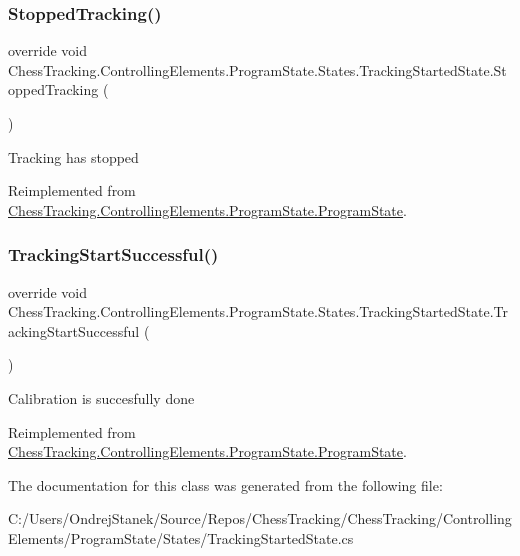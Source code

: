 \subsubsection{\texorpdfstring{StoppedTracking()}{StoppedTracking()}}
{\footnotesize\ttfamily override void Chess\+Tracking.\+Controlling\+Elements.\+Program\+State.\+States.\+Tracking\+Started\+State.\+Stopped\+Tracking (\begin{DoxyParamCaption}{ }\end{DoxyParamCaption})\hspace{0.3cm}{\ttfamily [virtual]}}



Tracking has stopped 



Reimplemented from \mbox{\hyperlink{class_chess_tracking_1_1_controlling_elements_1_1_program_state_1_1_program_state_a0c86a45963ed8eb2b938f5d8f2d956ff}{Chess\+Tracking.\+Controlling\+Elements.\+Program\+State.\+Program\+State}}.

\mbox{\label{class_chess_tracking_1_1_controlling_elements_1_1_program_state_1_1_states_1_1_tracking_started_state_aa1840f95aae0d1aa49a898b1387bdda5}} 
\subsubsection{\texorpdfstring{TrackingStartSuccessful()}{TrackingStartSuccessful()}}
{\footnotesize\ttfamily override void Chess\+Tracking.\+Controlling\+Elements.\+Program\+State.\+States.\+Tracking\+Started\+State.\+Tracking\+Start\+Successful (\begin{DoxyParamCaption}{ }\end{DoxyParamCaption})\hspace{0.3cm}{\ttfamily [virtual]}}



Calibration is succesfully done 



Reimplemented from \mbox{\hyperlink{class_chess_tracking_1_1_controlling_elements_1_1_program_state_1_1_program_state_a120f53f07c30eb53b34a7e1de82a4226}{Chess\+Tracking.\+Controlling\+Elements.\+Program\+State.\+Program\+State}}.



The documentation for this class was generated from the following file\+:\begin{DoxyCompactItemize}
\item 
C\+:/\+Users/\+Ondrej\+Stanek/\+Source/\+Repos/\+Chess\+Tracking/\+Chess\+Tracking/\+Controlling\+Elements/\+Program\+State/\+States/Tracking\+Started\+State.\+cs\end{DoxyCompactItemize}
